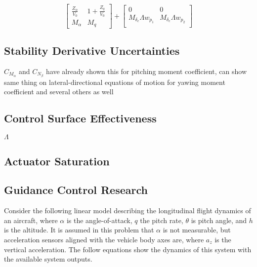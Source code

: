 \begin{equation*}
  \begin{bmatrix}
    \frac{Z_{\alpha}}{V_{0}} & 1+\frac{Z_{q}}{V_{0}} \\
    M_{\alpha} & M_{q}
  \end{bmatrix}
  +
  \begin{bmatrix}
    0 & 0 \\
    M_{\delta_{e}}\Lambda w_{p_{1}} & M_{\delta_{e}}\Lambda w_{p_{2}} \\
  \end{bmatrix}
\end{equation*}

\subsection{Stability Derivative Uncertainties}

$C_{M_{\alpha}}$ and $C_{N_{\beta}}$ have already shown this for pitching moment coefficient, can show same thing on lateral-directional equations of motion for yawing moment coefficient and several others as well

\subsection{Control Surface Effectiveness}

$\Lambda$

\subsection{Actuator Saturation}

\subsection{Guidance Control Research}

Consider the following linear model describing the longitudinal flight dynamics of an aircraft, where $\alpha$ is the angle-of-attack, $q$ the pitch rate, $\theta$ is pitch angle, and $h$ is the altitude.
It is assumed in this problem that $\alpha$ is not measurable, but acceleration sensors aligned with the vehicle body axes are, where $a_{z}$ is the vertical acceleration.
The follow equations show the dynamics of this system with the available system outputs.

